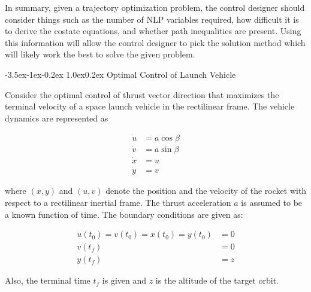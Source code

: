 \documentclass[11pt,letterpaper,onecolumn,notitlepage]{article}
\makeatletter
\renewcommand\section{\@startsection{section}{1}{\z@}%
{-3.5ex\@plus-1ex\@minus-0.2ex}%
{1.0ex\@plus0.2ex}%
{\fontsize{12pt}{12pt}\selectfont\bfseries\sffamily}}
\makeatother
\begin{document}
In summary, given a trajectory optimization problem, the control designer should consider things such as the number of NLP variables required, how difficult it is to derive the costate equations, and whether path inequalities are present.
Using this information will allow the control designer to pick the solution method which will likely work the best to solve the given problem.


\clearpage
\section{Optimal Control of Launch Vehicle}

Consider the optimal control of thrust vector direction that maximizes the terminal velocity of a space launch vehicle in the rectilinear frame.
The vehicle dynamics are represented as

\begin{align*}
  \dot{u}&=a\cos\beta \\
  \dot{v}&=a\sin\beta \\
  \dot{x}&=u \\
  \dot{y}&=v
\end{align*}

where $(x,y)$ and $(u,v)$ denote the position and the velocity of the rocket with respect to a rectilinear inertial frame.
The thrust acceleration $a$ is assumed to be a known function of time.
The boundary conditions are given as:

\begin{align*}
  u(t_{0})=v(t_{0})=x(t_{0})=y(t_{0})&=0 \\
  v(t_{f})&=0 \\
  y(t_{f})&=z
\end{align*}

Also, the terminal time $t_{f}$ is given and $z$ is the altitude of the target orbit.
\end{document}
